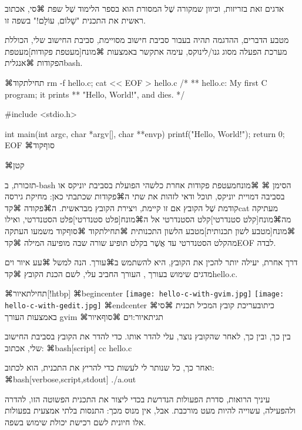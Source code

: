 אדגים זאת בזריזות, וכיוון שמקורה שֶׁל המסורת הוא בספר הלימוד
שֶׁל שפת ⌘סי, אכתוב
ראשית את התכנית "שָׁלוֹם, עוֹלָם!" בשפה זו.

מטבע הדברים, ההדגמה תהיה בעבור סביבת חישוב מסויימת, סביבת החישוב שלי, הכוללת
מערכת הפעלה מסוג גנו/לינוקס, עימה אתקשר באמצעות ⌘מונח[מעטפת פקודות]{מעטפת
  הפקודות} ⌘אנגלית{bash}.

⌘תחילת{קוד}
\bash[verbose,script,scriptFile=make-hello-c.sh]
rm -f hello.c; cat << EOF > hello.c
/*
** hello.c: My first C program; it prints
** "Hello, World!", and dies.
*/

#include <stdio.h>

int main(int argc, char *argv[], char **envp) {
  printf("Hello, World!\n");
  return 0;
}
EOF
\END
⌘סוף{קוד}

{⌘קטן
  \noindent\hrulefill

  תזכורת, ב-bash הסימן ⌘%
  ⌘מונח{מעטפת פקודות}
  אחרת כלשהי הפועלת בסביבת יוניקס או בסביבה דמויית יוניקס, תוכל ודאי
  לזהות את שתי ה⌘פקודות שכתבתי כאן: מחיקת גירסה קודמת שֶׁל הקובץ אם זו קיימת,
  ויצירת הקובץ מבראשית. ה⌘פקודה ⌘קד{cat} מעתיקה מה⌘מונח[קלט סטנדרטי]{קלט
    הסטנדרטי} אל ה⌘מונח[פלט סטנדרטי]{פלט הסטנדרטי}, ואילו ⌘מונח[מטבע לשון
  תכנותית]{מטבע הלשון התכנותית}
  ⌘תחילת{קוד}
  ⌘סוף{קוד}
  משמעו העתקה מהקלט הסטנדרטי עד אֲשֶׁר בקלט תופיע שורה שבה מופיעה המילה
  ⌘קד{EOF} לבדה.

  \par\noindent\hrulefill}

דרך אחרת, יעילה יותר להכין את הקובץ, היא להשתמש ב⌘עורך. הנה למשל ⌘עע איור וים
מדגים שימוש בעורך , העורך החביב עלי, לשם הכנת הקובץ ⌘קד{hello.c}.

⌘תחילת{איור}[!htbp]
⌘begin{center}
\texttt{[image: hello-c-with-gvim.jpg]}
\texttt{[image: hello-c-with-gedit.jpg]}
⌘end{center}
⌘כיתוב{עריכת קובץ המכיל תכנית ⌘סי באמצעות העורך gvim}
⌘תגית{איור:וים}
⌘סוף{איור}

בין כך, ובין כך, לאחר שהקובץ נוצר, עלי להדר אותו. כדי להדר את הקובץ בסביבת
החישוב שלי, אכתוב:
⌘bash[script]
cc hello.c
\END

ואחר כך, כל שנותר לי לעשות כדי להריץ את התכנית, הוא לכתוב:
⌘bash[verbose,script,stdout]
./a.out
\END

עיניך הרואות, סדרת הפעולות הנדרשת בכדי ליצור את התכנית הפשוטה הזו, להדרה
ולהפעילה, עשוייה להיות מעט מורכבת. אבל, אין מנוס מכך: התנסות בלתי אמצעית
בפעולות אלו חיונית לשם רכישת יכולת שימוש בשפה.

